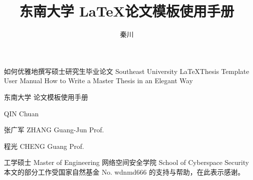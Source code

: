 \documentclass[algorithmlist,figurelist,tablelist,nomlist]{seumasterthesis}
\begin{document}

\title
    {东南大学 \LaTeX 论文模板使用手册}                                      %
    {如何优雅地撰写硕士研究生毕业论文}                                          %
    {Southeast University \LaTeX Thesis Template User Manual}   %
    {How to Write a Master Thesis in an Elegant Way}            %

\spine
    {东南大学  论文模板使用手册}                      %
    {}                                                          %

\author
    {秦川}                        %
    {QIN Chuan}                 %

\advisor
    {张广军}                       %
    {ZHANG Guang-Jun}           %
    {Prof.}                     %

\coadvisor
    {程光}                        %
    {CHENG Guang}               %
    {Prof.}                     %

\degreetype                     %
    {工学硕士}
    {Master of Engineering}
\department                     %
    {网络空间安全学院}
    {School of Cyberspace Security}
\seuthesisthanks                %
    {本文的部分工作受国家自然基金 No. wdnmd666 的支持与帮助，在此表示感谢。}
\end{document}
